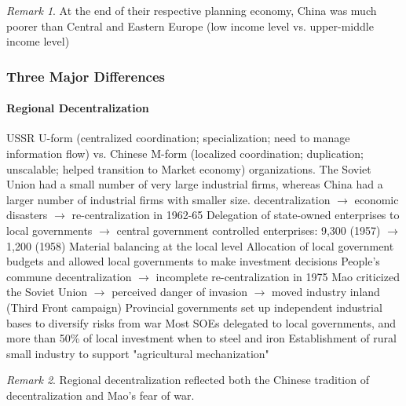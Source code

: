 \documentclass[11pt]{article}
\theoremstyle{definition}
\theoremstyle{remark}
\newtheorem*{remark}{Remark}
\begin{document}
\begin{remark}
At the end of their respective planning economy, China was much poorer than Central and Eastern Europe (low income level vs. upper-middle income level)
\end{remark}

\subsubsection{Three Major Differences}
\paragraph{Regional Decentralization} 
\begin{outline}[enumerate]
\1 USSR U-form (centralized coordination; specialization; need to manage information flow) vs. Chinese M-form (localized coordination; duplication; unscalable; helped transition to Market economy) organizations.
	\2 The Soviet Union had a small number of very large industrial firms, whereas China had a larger number of industrial firms with smaller size. 
 decentralization $\to$ economic disasters $\to$ re-centralization in 1962-65
	\2 Delegation of state-owned enterprises to local governments $\to$ central government controlled enterprises: 9,300 (1957) $\to$ 1,200 (1958)
	\2 Material balancing at the local level
	\2 Allocation of local government budgets and allowed local governments to make investment decisions
	\2 People's commune
 decentralization $\to$ incomplete re-centralization in 1975
	\2 Mao criticized the Soviet Union $\to$ perceived danger of invasion $\to$ moved industry inland (Third Front campaign)
	\2 Provincial governments set up independent industrial bases to diversify risks from war
	\2 Most SOEs delegated to local governments, and more than 50\% of local investment when to steel and iron
	\2 Establishment of rural small industry to support "agricultural mechanization" 
\end{outline}
\begin{remark}
Regional decentralization reflected both the Chinese tradition of decentralization and Mao's fear of war.
\end{remark}
\end{document}

